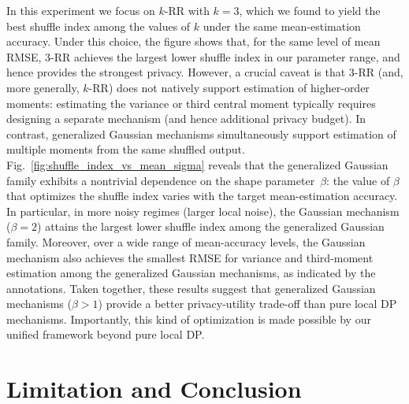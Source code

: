 \documentclass{article}
\theoremstyle{plain}
\theoremstyle{definition}
\begin{document}
In this experiment we focus on $k$-RR with $k=3$, which we found to yield the best shuffle index among the values of $k$ under the same mean-estimation accuracy.
Under this choice, the figure shows that, for the same level of mean RMSE, $3$-RR achieves the largest lower shuffle index in our parameter range, and hence provides the strongest privacy.
However, a crucial caveat is that $3$-RR (and, more generally, $k$-RR) does not natively support estimation of higher-order moments: estimating the variance or third central moment typically requires designing a separate mechanism (and hence additional privacy budget).
In contrast, generalized Gaussian mechanisms simultaneously support estimation of multiple moments from the same shuffled output.
Fig.~\ref{fig:shuffle_index_vs_mean_sigma} reveals that the generalized Gaussian family exhibits a nontrivial dependence on the shape parameter~$\beta$: the value of $\beta$ that optimizes the shuffle index varies with the target mean-estimation accuracy.
In particular, in more noisy regimes (larger local noise), the Gaussian mechanism ($\beta=2$) attains the largest lower shuffle index among the generalized Gaussian family.
Moreover, over a wide range of mean-accuracy levels, the Gaussian mechanism also achieves the smallest RMSE for variance and third-moment estimation among the generalized Gaussian mechanisms, as indicated by the annotations.
Taken together, these results suggest that generalized Gaussian mechanisms ($\beta>1$) provide a better privacy-utility trade-off than pure local DP mechanisms.
Importantly, this kind of optimization is made possible by our unified framework beyond pure local DP.


\section{Limitation and Conclusion}


\end{document}
